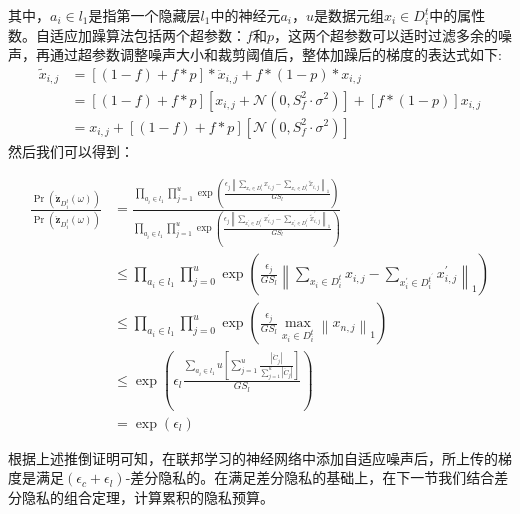 其中，$a_{i} \in l_{1}$是指第一个隐藏层$l_{1}$中的神经元$a_{i}$，$u$是数据元组$x_{i} \in D_{i}^{t}$中的属性数。自适应加躁算法包括两个超参数：$f$和$p$，这两个超参数可以适时过滤多余的噪声，再通过超参数调整噪声大小和裁剪阈值后，整体加躁后的梯度的表达式如下:
\begin{equation}
\begin{aligned}
\tilde{x}_{i, j} &=[(1-f)+f * p] * \ddot{x}_{i, j}+f *(1-p) * x_{i, j} \\
&=[(1-f)+f * p]\left[x_{i, j}+\mathcal{N}\left(0, S_{f}^{2} \cdot \sigma^{2}\right)\right]+[f *(1-p)] x_{i, j} \\
&=x_{i, j}+[(1-f)+f * p]\left[\mathcal{N}\left(0, S_{f}^{2} \cdot \sigma^{2}\right)\right]
\end{aligned}
\end{equation}
然后我们可以得到：

\begin{equation}
\begin{aligned}
\frac{\operatorname{Pr}\left(\ddot{\mathbf{z}}_{D_{i}^{t}}(\omega)\right)}{\operatorname{Pr}\left(\ddot{\mathbf{z}}_{D_{i}^{t}}(\omega)\right)} &=\frac{\prod_{a_{i} \in l_{1}} \prod_{j=1}^{u} \exp \left(\frac{\epsilon_{j}\left\|\sum_{x_{i} \in D_{i}^{t}} x_{i, j}-\sum_{x_{i} \in D_{i}^{t}} \tilde{x}_{i, j}\right\|_{1}}{G S_{l}}\right)}{\prod_{a_{i} \in l_{1}} \prod_{j=1}^{u} \exp \left(\frac{\epsilon_{j}\left\|\sum_{x_{i}^{\prime} \in D_{i}^{t^{\prime}}} x_{i, j}^{\prime}-\sum_{x_{i}^{\prime} \in D_{i}^{t^{\prime}}} \tilde{x}_{i, j}^{\prime}\right\|_{1}}{G S_{l}}\right)} \\
& \leq \prod_{a_{i} \in l_{1}} \prod_{j=0}^{u} \exp \left(\frac{\epsilon_{j}}{G S_{l}}\left\|\sum_{x_{i} \in D_{i}^{t}} x_{i, j}-\sum_{x_{i}^{\prime} \in D_{i}^{t^{\prime}}} x_{i, j}^{\prime}\right\|_{1}\right) \\
& \leq \prod_{a_{i} \in l_{1}} \prod_{j=0}^{u} \exp \left(\frac{\epsilon_{j}}{G S_{l}} \max _{x_{i} \in D_{i}^{t}}\left\|x_{n, j}\right\|_{1}\right) \\
& \leq \exp \left(\epsilon_{l} \frac{\sum_{a_{i} \in l_{1}} u\left[\sum_{j=1}^{u} \frac{\left|\ddot{C}_{j}\right|}{\sum_{j=1}^{u}\left|\ddot{C}_{j}\right|}\right]}{G S_{l}}\right) \\
&=\exp \left(\epsilon_{l}\right)
\end{aligned}
\end{equation}

根据上述推倒证明可知，在联邦学习的神经网络中添加自适应噪声后，所上传的梯度是满足$\left(\epsilon_{c}+\epsilon_{l}\right)$-差分隐私的。在满足差分隐私的基础上，在下一节我们结合差分隐私的组合定理，计算累积的隐私预算。

